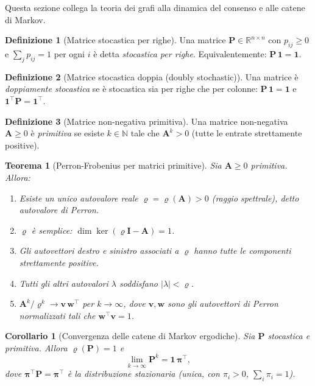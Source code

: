 \documentclass[a4paper,11pt]{article}
\theoremstyle{definition}
\newtheorem{defn}{Definizione}[section]
\theoremstyle{plain}
\newtheorem{thm}{Teorema}[section]
\newtheorem{cor}{Corollario}[section]
\theoremstyle{remark}
\newcommand{\R}{\mathbb{R}}
\newcommand{\N}{\mathbb{N}}
\newcommand{\mat}[1]{\mathbf{#1}}
\newcommand{\vect}[1]{\bm{#1}}
\newcommand{\ones}{\mathbf{1}}
\newcommand{\specrad}[1]{\varrho\!\left(#1\right)}
\DeclareMathOperator{\Ker}{ker}
\begin{document}
Questa sezione collega la teoria dei grafi alla dinamica del consenso
e alle catene di Markov.

\begin{defn}[Matrice stocastica per righe]
Una matrice $\mat{P} \in \R^{n\times n}$ con $p_{ij} \geq 0$ e
$\sum_j p_{ij} = 1$ per ogni $i$ è detta \emph{stocastica per righe}.
Equivalentemente: $\mat{P}\,\ones = \ones$.
\end{defn}

\begin{defn}[Matrice stocastica doppia (doubly stochastic)]
Una matrice è \emph{doppiamente stocastica} se è stocastica sia per righe
che per colonne: $\mat{P}\,\ones = \ones$ e $\ones^\top \mat{P} = \ones^\top$.
\end{defn}

\begin{defn}[Matrice non-negativa primitiva]
Una matrice non-negativa $\mat{A} \geq 0$ è \emph{primitiva} se esiste
$k \in \N$ tale che $\mat{A}^k > 0$ (tutte le entrate strettamente positive).
\end{defn}

\begin{thm}[Perron-Frobenius per matrici primitive]
\label{thm:pf}
Sia $\mat{A} \geq 0$ primitiva. Allora:
\begin{enumerate}[label=(\roman*), noitemsep]
  \item Esiste un unico autovalore reale $\varrho = \specrad{\mat{A}} > 0$
        (raggio spettrale), detto \emph{autovalore di Perron}.
  \item $\varrho$ è semplice: $\dim\Ker(\varrho\mat{I}-\mat{A})=1$.
  \item Gli autovettori destro e sinistro associati a $\varrho$ hanno
        tutte le componenti strettamente positive.
  \item Tutti gli altri autovalori $\lambda$ soddisfano $|\lambda| < \varrho$.
  \item $\mat{A}^k / \varrho^k \to \vect{v}\,\vect{w}^\top$ per $k\to\infty$,
        dove $\vect{v}, \vect{w}$ sono gli autovettori di Perron
        normalizzati tali che $\vect{w}^\top\vect{v}=1$.
\end{enumerate}
\end{thm}

\begin{cor}[Convergenza delle catene di Markov ergodiche]
Sia $\mat{P}$ stocastica e primitiva. Allora $\varrho(\mat{P})=1$ e
\[
  \lim_{k\to\infty} \mat{P}^k = \ones\,\vect{\pi}^\top,
\]
dove $\vect{\pi}^\top \mat{P} = \vect{\pi}^\top$ è la \emph{distribuzione stazionaria}
(unica, con $\pi_i > 0$, $\sum_i \pi_i = 1$).
\end{cor}
\end{document}
